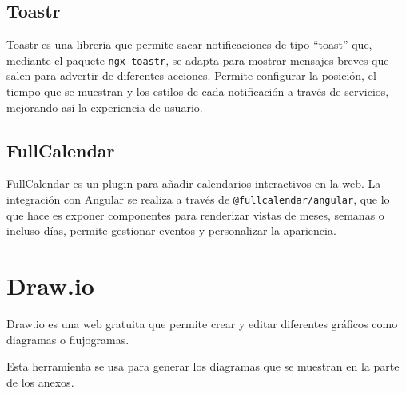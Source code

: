\subsection{Toastr}
Toastr es una librería que permite sacar notificaciones de tipo “toast” que, mediante el paquete \texttt{ngx-toastr}, se adapta para mostrar mensajes breves que salen para advertir de diferentes acciones. Permite configurar la posición, el tiempo que se muestran y los estilos de cada notificación a través de servicios, mejorando así la experiencia de usuario.

\subsection{FullCalendar}
FullCalendar es un plugin para añadir calendarios interactivos en la web. La integración con Angular se realiza a través de \texttt{@fullcalendar/angular}, que lo que hace es exponer componentes para renderizar vistas de meses, semanas o incluso días, permite gestionar eventos y personalizar la apariencia.


\section{Draw.io}\label{drawio}

Draw.io es una web gratuita que permite crear y editar diferentes gráficos como diagramas o flujogramas. 

Esta herramienta se usa para generar los diagramas que se muestran en la parte de los anexos.